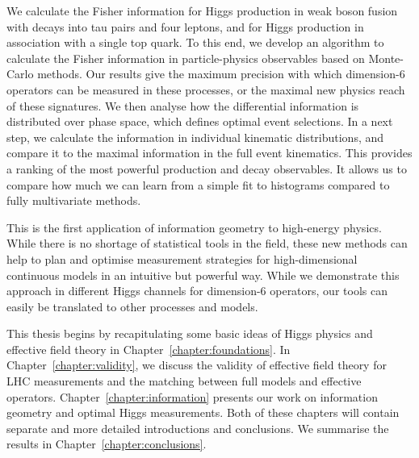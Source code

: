We calculate the Fisher information for Higgs production in weak boson
fusion with decays into tau pairs and four leptons, and for Higgs
production in association with a single top quark. To this end, we
develop an algorithm to calculate the Fisher information in
particle-physics observables based on Monte-Carlo methods. Our results
give the maximum precision with which dimension-6 operators can be
measured in these processes, or the maximal new physics reach of these
signatures. We then analyse how the differential information is
distributed over phase space, which defines optimal event
selections. In a next step, we calculate the information in individual
kinematic distributions, and compare it to the maximal information in
the full event kinematics. This provides a ranking of the most
powerful production and decay observables. It allows us to compare how
much we can learn from a simple fit to histograms compared to fully
multivariate methods.

This is the first application of information geometry to high-energy
physics. While there is no shortage of statistical tools in the field,
these new methods can help to plan and optimise measurement strategies
for high-dimensional continuous models in an intuitive but powerful
way. While we demonstrate this approach in different Higgs channels
for dimension-6 operators, our tools can easily be translated to other
processes and models.

\newparagraph
%
This thesis begins by recapitulating some basic ideas of Higgs physics
and effective field theory in Chapter~\ref{chapter:foundations}. In
Chapter~\ref{chapter:validity}, we discuss the validity of effective
field theory for LHC measurements and the matching between full models
and effective operators. Chapter~\ref{chapter:information} presents
our work on information geometry and optimal Higgs measurements. Both
of these chapters will contain separate and more detailed introductions
and conclusions. We summarise the results in
Chapter~\ref{chapter:conclusions}.
